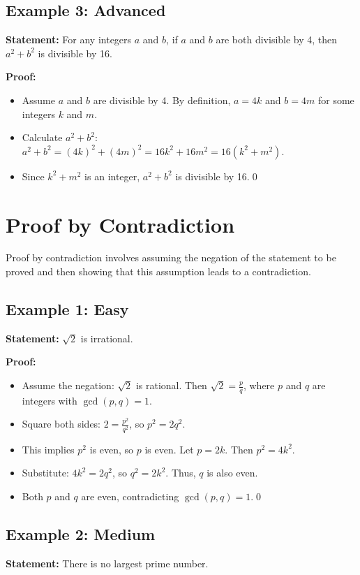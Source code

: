\documentclass[12pt,a4paper]{article}
\begin{document}
\subsection{Example 3: Advanced}
\textbf{Statement:} For any integers $a$ and $b$, if $a$ and $b$ are both divisible by 4, then $a^2 + b^2$ is divisible by 16.

\textbf{Proof:}
\begin{itemize}
    \item Assume $a$ and $b$ are divisible by 4. By definition, $a = 4k$ and $b = 4m$ for some integers $k$ and $m$.
    \item Calculate $a^2 + b^2$: $a^2 + b^2 = (4k)^2 + (4m)^2 = 16k^2 + 16m^2 = 16(k^2 + m^2)$.
    \item Since $k^2 + m^2$ is an integer, $a^2 + b^2$ is divisible by 16.\qed
\end{itemize}

\newpage

\section{Proof by Contradiction}
Proof by contradiction involves assuming the negation of the statement to be proved and then showing that this assumption leads to a contradiction.

\subsection{Example 1: Easy}
\textbf{Statement:} $\sqrt{2}$ is irrational.

\textbf{Proof:}
\begin{itemize}
    \item Assume the negation: $\sqrt{2}$ is rational. Then $\sqrt{2} = \frac{p}{q}$, where $p$ and $q$ are integers with $\gcd(p, q) = 1$.
    \item Square both sides: $2 = \frac{p^2}{q^2}$, so $p^2 = 2q^2$.
    \item This implies $p^2$ is even, so $p$ is even. Let $p = 2k$. Then $p^2 = 4k^2$.
    \item Substitute: $4k^2 = 2q^2$, so $q^2 = 2k^2$. Thus, $q$ is also even.
    \item Both $p$ and $q$ are even, contradicting $\gcd(p, q) = 1$.\qed
\end{itemize}

\subsection{Example 2: Medium}
\textbf{Statement:} There is no largest prime number.
\end{document}
